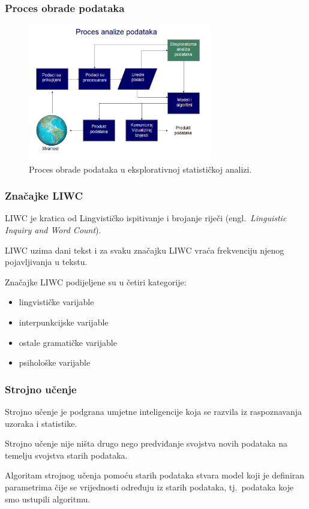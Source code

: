 \documentclass{beamer}
\begin{document}
\begin{frame}
\frametitle{Proces obrade podataka}

\begin{figure}[]
	\centering
	\includegraphics[width=8cm]{img/eda.png}
	\caption{Proces obrade podataka u eksplorativnoj statističkoj analizi.}
	\label{fig:eda}
\end{figure}

\end{frame}

\begin{frame}
\frametitle{Značajke LIWC}
LIWC je kratica od Lingvističko ispitivanje i brojanje riječi (engl.~\emph{Linguistic Inquiry and Word Count}). 
\bigskip


LIWC uzima dani tekst i za svaku značajku LIWC vraća frekvenciju njenog pojavljivanja u tekstu. 
\bigskip

Značajke LIWC podijeljene su u četiri kategorije:
\begin{itemize}
\item lingvističke varijable 
\item interpunkcijske varijable
\item ostale gramatičke varijable
\item psihološke varijable
\end{itemize}

\end{frame}

\begin{frame}
\frametitle{Strojno učenje}
Strojno učenje je podgrana umjetne inteligencije koja se razvila iz raspoznavanja uzoraka i statistike.
\bigskip

Strojno učenje nije ništa drugo nego predviđanje svojstva novih podataka na temelju svojstva starih podataka.

\bigskip
Algoritam strojnog učenja pomoću starih podataka stvara model koji je definiran parametrima čije se vrijednosti određuju iz starih podataka, tj.~podataka koje smo ustupili algoritmu.
\end{frame}
\end{document}

